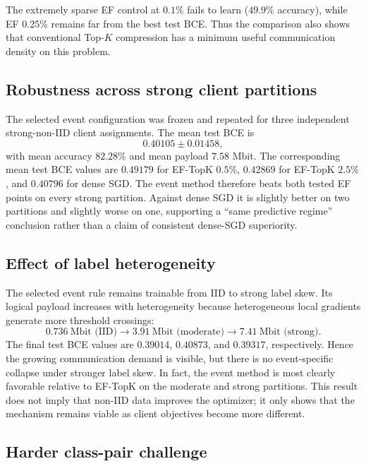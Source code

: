 The extremely sparse EF control at $0.1\%$ fails to learn ($49.9\%$ accuracy), while EF $0.25\%$ remains far from the best test BCE. Thus the comparison also shows that conventional Top-$K$ compression has a minimum useful communication density on this problem.

\subsection{Robustness across strong client partitions}

The selected event configuration was frozen and repeated for three independent strong-non-IID client assignments. The mean test BCE is
\begin{equation}
0.40105\pm0.01458,
\end{equation}
with mean accuracy $82.28\%$ and mean payload $7.58$ Mbit. The corresponding mean test BCE values are $0.49179$ for EF-TopK $0.5\%$, $0.42869$ for EF-TopK $2.5\%$, and $0.40796$ for dense SGD. The event method therefore beats both tested EF points on every strong partition. Against dense SGD it is slightly better on two partitions and slightly worse on one, supporting a ``same predictive regime'' conclusion rather than a claim of consistent dense-SGD superiority.

\subsection{Effect of label heterogeneity}

The selected event rule remains trainable from IID to strong label skew. Its logical payload increases with heterogeneity because heterogeneous local gradients generate more threshold crossings:
\begin{equation}
0.736\ \text{Mbit (IID)}
\rightarrow
3.91\ \text{Mbit (moderate)}
\rightarrow
7.41\ \text{Mbit (strong)}.
\end{equation}
The final test BCE values are $0.39014$, $0.40873$, and $0.39317$, respectively. Hence the growing communication demand is visible, but there is no event-specific collapse under stronger label skew. In fact, the event method is most clearly favorable relative to EF-TopK on the moderate and strong partitions. This result does not imply that non-IID data improves the optimizer; it only shows that the mechanism remains viable as client objectives become more different.

\subsection{Harder class-pair challenge}

